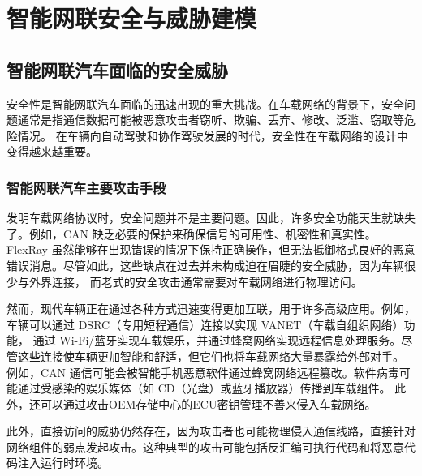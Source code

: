 \chapter{智能网联安全与威胁建模}
\label{ch3}

\section{智能网联汽车面临的安全威胁}
安全性是智能网联汽车面临的迅速出现的重大挑战。在车载网络的背景下，安全问题通常是指通信数据可能被恶意攻击者窃听、欺骗、丢弃、修改、泛滥、窃取等危险情况。
在车辆向自动驾驶和协作驾驶发展的时代，安全性在车载网络的设计中变得越来越重要。
\subsection[]{智能网联汽车主要攻击手段}
发明车载网络协议时，安全问题并不是主要问题。因此，许多安全功能天生就缺失了。例如，CAN 缺乏必要的保护来确保信号的可用性、机密性和真实性\cite{woo2014practical}。
FlexRay 虽然能够在出现错误的情况下保持正确操作，但无法抵御格式良好的恶意错误消息\cite{kleberger2011security}。尽管如此，这些缺点在过去并未构成迫在眉睫的安全威胁，因为车辆很少与外界连接，
而老式的安全攻击通常需要对车载网络进行物理访问。

然而，现代车辆正在通过各种方式迅速变得更加互联，用于许多高级应用。例如，车辆可以通过 DSRC（专用短程通信）连接以实现 VANET（车载自组织网络）功能，
通过 Wi-Fi/蓝牙实现车载娱乐，并通过蜂窝网络实现远程信息处理服务。尽管这些连接使车辆更加智能和舒适，但它们也将车载网络大量暴露给外部对手。
例如，CAN 通信可能会被智能手机恶意软件通过蜂窝网络远程篡改\cite{woo2014practical}。软件病毒可能通过受感染的娱乐媒体（如 CD（光盘）或蓝牙播放器）传播到车载组件。
此外，还可以通过攻击OEM存储中心的ECU密钥管理不善来侵入车载网络。

此外，直接访问的威胁仍然存在，因为攻击者也可能物理侵入通信线路，直接针对网络组件的弱点发起攻击。这种典型的攻击可能包括反汇编可执行代码和将恶意代码注入运行时环境。

